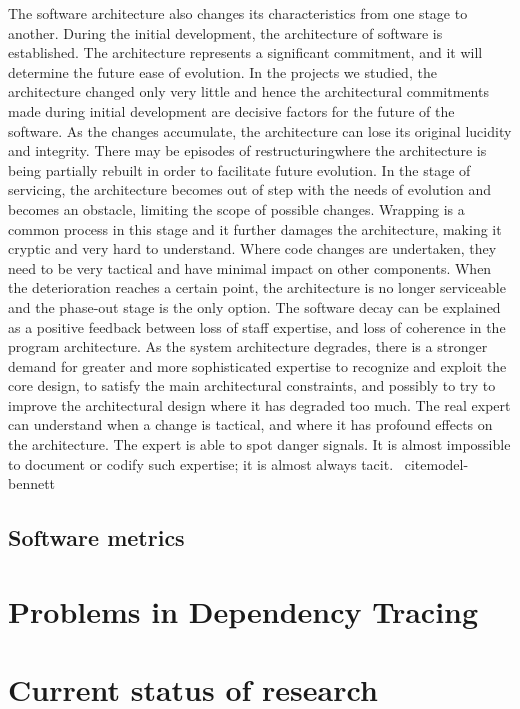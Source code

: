 \documentclass[12pt]{mitthesis}
\begin{document}
The software architecture also changes its characteristics from one stage to another.
During the initial development, the architecture of software is established. The
architecture represents a significant commitment, and it will determine the future ease
of evolution. In the projects we studied, the architecture changed only very little and
hence the architectural commitments made during initial development are decisive
factors for the future of the software.
As the changes accumulate, the architecture can lose its original lucidity and integrity.
There may be episodes of restructuringwhere the architecture is being partially rebuilt
in order to facilitate future evolution.
In the stage of servicing, the architecture becomes out of step with the needs of
evolution and becomes an obstacle, limiting the scope of possible changes. Wrapping
is a common process in this stage and it further damages the architecture, making it
cryptic and very hard to understand. Where code changes are undertaken, they need to
be very tactical and have minimal impact on other components. When the
deterioration reaches a certain point, the architecture is no longer serviceable and the
phase-out stage is the only option.
The software decay can be explained as a positive feedback between loss of staff
expertise, and loss of coherence in the program architecture. As the system
architecture degrades, there is a stronger demand for greater and more sophisticated
expertise to recognize and exploit the core design, to satisfy the main architectural
constraints, and possibly to try to improve the architectural design where it has
degraded too much. The real expert can understand when a change is tactical, and
where it has profound effects on the architecture. The expert is able to spot danger
signals. It is almost impossible to document or codify such expertise; it is almost
always tacit. \ cite{model-bennett}

\section{Software metrics}

\chapter{Problems in Dependency Tracing}


\chapter{Current status of research}
\end{document}
